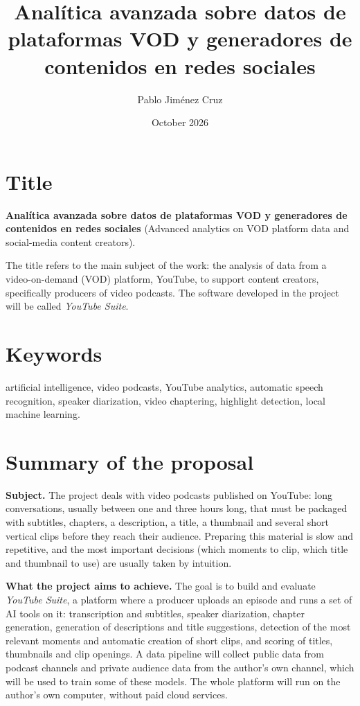 \documentclass[ENG]{TFUOC}
\title{Analítica avanzada sobre datos de plataformas VOD y generadores de contenidos en redes sociales}
\author{Pablo Jiménez Cruz}
\date{October 2026}
\begin{document}
\estructura

\tableofcontents

\renewcommand{\thesection}{\arabic{section}}

\section{Title}

\textbf{Analítica avanzada sobre datos de plataformas VOD y generadores de contenidos en redes sociales} (Advanced analytics on VOD platform data and social-media content creators).

The title refers to the main subject of the work: the analysis of data from a video-on-demand (VOD) platform, YouTube, to support content creators, specifically producers of video podcasts. The software developed in the project will be called \textit{YouTube Suite}.

\section{Keywords}

artificial intelligence, video podcasts, YouTube analytics, automatic speech recognition, speaker diarization, video chaptering, highlight detection, local machine learning.

\section{Summary of the proposal}

\textbf{Subject.} The project deals with video podcasts published on YouTube: long conversations, usually between one and three hours long, that must be packaged with subtitles, chapters, a description, a title, a thumbnail and several short vertical clips before they reach their audience. Preparing this material is slow and repetitive, and the most important decisions (which moments to clip, which title and thumbnail to use) are usually taken by intuition.

\textbf{What the project aims to achieve.} The goal is to build and evaluate \textit{YouTube Suite}, a platform where a producer uploads an episode and runs a set of AI tools on it: transcription and subtitles, speaker diarization, chapter generation, generation of descriptions and title suggestions, detection of the most relevant moments and automatic creation of short clips, and scoring of titles, thumbnails and clip openings. A data pipeline will collect public data from podcast channels and private audience data from the author's own channel, which will be used to train some of these models. The whole platform will run on the author's own computer, without paid cloud services.
\end{document}
